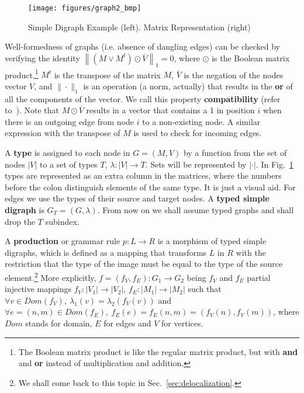 \documentclass{fundam}
\newcommand{\abb}[3]{#1 \colon #2 \rightarrow #3}
\begin{document}
\begin{figure}[htbp]
  \centering
  \texttt{[image: figures/graph2\_bmp]}
  \caption{Simple Digraph Example (left). Matrix Representation
    (right)}
  \label{fig:example_graph}
\end{figure}


Well-formedness of graphs (i.e. absence of dangling edges) can be
checked by verifying the identity $\left\| \left( M \vee M^t \right)
  \odot \overline{V}\right\| _1 = 0$, where $\odot$ is the Boolean
matrix product,\footnote{The Boolean matrix product is like the regular
  matrix product, but with \textbf{and} and \textbf{or} instead of
  multiplication and addition.} $M^t$ is the transpose of the matrix
$M$, $\overline{V}$ is the negation of the nodes vector $V$, and $\|
\cdot \|_1$ is an operation (a norm, actually) that results in the
{\bf or} of all the components of the vector. We call this property
\textbf{compatibility} (refer to~\cite{JuanPP_1}). Note that $M \odot
\overline{V}$ results in a vector that contains a 1 in position $i$
when there is an outgoing edge from node $i$ to a non-existing node. A
similar expression with the transpose of $M$ is used to check for
incoming edges.


A \textbf{type} is assigned to each node in $G=(M,V)$ by a function
from the set of nodes $|V|$ to a set of types $T$,
$\abb{\lambda}{|V|}{T}$. Sets will be represented by $|\cdot|$. In
Fig.~\ref{fig:example_graph} types are represented as an extra column
in the matrices, where the numbers before the colon distinguish
elements of the same type. It is just a visual aid. For edges we use
the types of their source and target nodes. A \textbf{typed simple
  digraph} is $G_T=(G, \lambda)$. From now on we shall assume typed
graphs and shall drop the $T$ subindex.

A \textbf{production} or grammar rule $p:L \rightarrow R$ is a
morphism of typed simple digraphs, which is defined as a mapping that
transforms $L$ in $R$ with the restriction that the type of the image
must be equal to the type of the source element.\footnote{We shall
  come back to this topic in Sec.~\ref{sec:delocalization}.} More
explicitly, $\abb{f=(f_V, f_E)}{G_1}{G_2}$ being $f_V$ and $f_E$
partial injective mappings $\abb{f_V}{|V_1|}{|V_2|}$,
$\abb{f_E}{|M_1|}{|M_2|}$ such that $\forall v \in Dom(f_V), \:
\lambda_1(v) = \lambda_2(f_V(v))$ and $\forall e=(n, m) \in Dom(f_E),
\: f_E(e) = f_E(n, m)=(f_V(n), f_V(m))$, where $Dom$ stands for
domain, $E$ for edges and $V$ for vertices.
\end{document}
